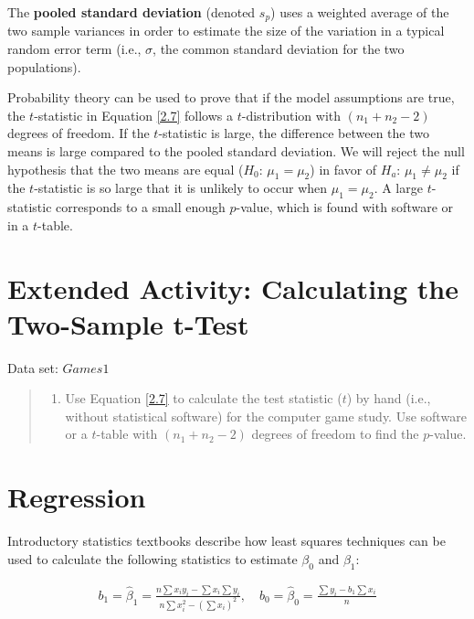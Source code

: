 \documentclass[
]{report}
\providecommand{\tightlist}{%
  \setlength{\itemsep}{0pt}\setlength{\parskip}{0pt}}
\begin{document}
The \textbf{pooled standard deviation} (denoted \(s_p\)) uses a weighted average of the two sample variances in order to estimate the size of the variation in a typical random error term (i.e., \(\sigma\), the common standard deviation for the two populations).

Probability theory can be used to prove that if the model assumptions are true, the \(t\)-statistic in Equation \ref{2.7} follows a \(t\)-distribution with \((n_1 + n_2 - 2)\) degrees of freedom. If the \(t\)-statistic is large, the difference between the two means is large compared to the pooled standard deviation. We will reject the null hypothesis that the two means are equal (\(H_0\): \(\mu_1 = \mu_2\)) in favor of \(H_a\): \(\mu_1 \ne \mu_2\) if the \(t\)-statistic is so large that it is unlikely to occur when \(\mu_1 = \mu_2\). A large \(t\)-statistic corresponds to a small enough \(p\)-value, which is found with software or in a \(t\)-table.

\section*{Extended Activity: Calculating the Two-Sample t-Test}\label{extended-activity-calculating-the-two-sample-t-test}

Data set: \(Games1\)

\begin{quote}
\begin{enumerate}
\def\labelenumi{\arabic{enumi}.}
\setcounter{enumi}{33}
\tightlist
\item
  Use Equation \ref{2.7} to calculate the test statistic (\(t\)) by hand (i.e., without statistical software) for the computer game study. Use software or a \(t\)-table with \((n_1 + n_2 - 2)\) degrees of freedom to find the \(p\)-value.
\end{enumerate}
\end{quote}

\section*{Regression}\label{regression}

Introductory statistics textbooks describe how least squares techniques can be used to calculate the following statistics to estimate \(\beta_0\) and \(\beta_1\):

\begin{align} \label{2.8}
b_1 = \hat{\beta}_1 = \frac{n\sum x_i y_i - \sum x_i \sum y_i}{n\sum x_i^2 - (\sum x_i)^2}, \quad
b_0 = \hat{\beta}_0 = \frac{\sum y_i - b_1 \sum x_i}{n}
\tag{2.8}
\end{align}
\end{document}
